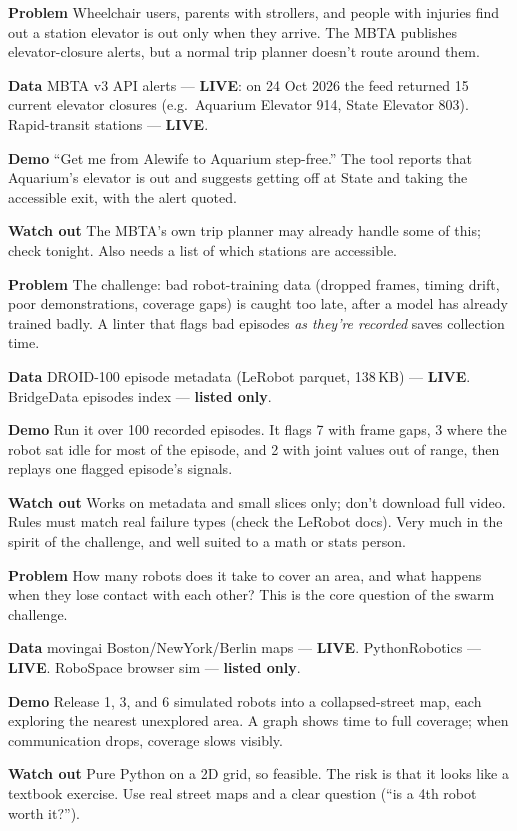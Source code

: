 \documentclass[11pt]{article}
\newcommand{\LIVE}{\textcolor{okgreen}{\textbf{LIVE}}}
\newcommand{\LISTED}{\textcolor{greyish}{\textbf{listed only}}}
\newcommand{\field}[1]{\textbf{\textsf{#1}}\quad}
\begin{document}
\newcommand{\inspo}[7]{%
\begin{tcolorbox}[breakable, enhanced, colback=white, colframe=#1!70, boxrule=0.6pt, arc=2pt,
  left=6pt, right=6pt, top=3pt, bottom=3pt, title={\textbf{#2}\\[-1pt]{\small #3}}, coltitle=white,
  colbacktitle=#1!80, before skip=6pt, after skip=6pt]
\field{Problem} #4\par
\field{Data} #5\par
\field{Demo} #6\par
\field{Watch out} #7
\end{tcolorbox}}

\inspo{civic}{Step-free MBTA route checker}{Civic: Safer \& connected places $\cdot$ \textbf{data checked}}
{Wheelchair users, parents with strollers, and people with injuries find out a station
elevator is out only when they arrive. The MBTA publishes elevator-closure alerts, but a
normal trip planner doesn't route around them.}
{MBTA v3 API alerts --- \LIVE: on 24 Oct 2026 the feed returned 15 current elevator
closures (e.g.\ Aquarium Elevator 914, State Elevator 803). Rapid-transit stations --- \LIVE.}
{``Get me from Alewife to Aquarium step-free.'' The tool reports that Aquarium's elevator is
out and suggests getting off at State and taking the accessible exit, with the alert quoted.}
{The MBTA's own trip planner may already handle some of this; check tonight. Also needs a
list of which stations are accessible.}

\inspo{robo}{Robot-demonstration data linter}{Robotics: Real-Time Control for Data Quality $\cdot$ \textbf{data checked}}
{The challenge: bad robot-training data (dropped frames, timing drift, poor demonstrations,
coverage gaps) is caught too late, after a model has already trained badly. A linter that
flags bad episodes \emph{as they're recorded} saves collection time.}
{DROID-100 episode metadata (LeRobot parquet, 138\,KB) --- \LIVE. BridgeData episodes index --- \LISTED.}
{Run it over 100 recorded episodes. It flags 7 with frame gaps, 3 where the robot sat idle
for most of the episode, and 2 with joint values out of range, then replays one flagged
episode's signals.}
{Works on metadata and small slices only; don't download full video. Rules must match real
failure types (check the LeRobot docs). Very much in the spirit of the challenge, and well
suited to a math or stats person.}

\inspo{robo}{Swarm search-and-rescue on real Boston streets}{Robotics: Swarm Robotics $\cdot$ \textbf{data checked}}
{How many robots does it take to cover an area, and what happens when they lose contact
with each other? This is the core question of the swarm challenge.}
{movingai Boston/NewYork/Berlin maps --- \LIVE. PythonRobotics --- \LIVE. RoboSpace browser sim --- \LISTED.}
{Release 1, 3, and 6 simulated robots into a collapsed-street map, each exploring the nearest
unexplored area. A graph shows time to full coverage; when communication drops, coverage
slows visibly.}
{Pure Python on a 2D grid, so feasible. The risk is that it looks like a textbook
exercise. Use real street maps and a clear question (``is a 4th robot worth it?'').}
\end{document}
